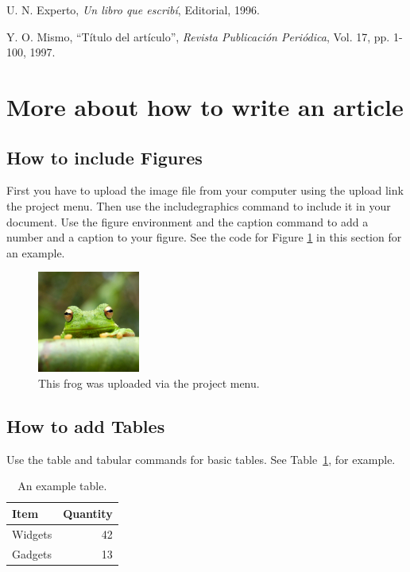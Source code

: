 \documentclass[a4paper]{article}
\begin{document}
\begin{thebibliography}{10}



U. N. Experto, \emph{Un libro que escribí},
Editorial, 1996.

Y. O. Mismo,
``Título del artículo'',
\emph{Revista Publicación Periódica}, Vol. 17, pp. 1-100, 1997.
\end{thebibliography}

\newpage 

\section*{More about how to write an article}
\subsection{How to include Figures}

First you have to upload the image file from your computer using the upload link the project menu. Then use the includegraphics command to include it in your document. Use the figure environment and the caption command to add a number and a caption to your figure. See the code for Figure \ref{fig:frog} in this section for an example.

\begin{figure}[h]
\centering
\includegraphics[width=0.3\textwidth]{frog.jpg}
\caption{\label{fig:frog}This frog was uploaded via the project menu.}
\end{figure}


\subsection{How to add Tables}

Use the table and tabular commands for basic tables. See Table~\ref{tab:widgets}, for example. 

\begin{table}[h]
\centering
\begin{tabular}{l|r}
Item & Quantity \\\hline
Widgets & 42 \\
Gadgets & 13
\end{tabular}
\caption{\label{tab:widgets}An example table.}
\end{table}
\end{document}
